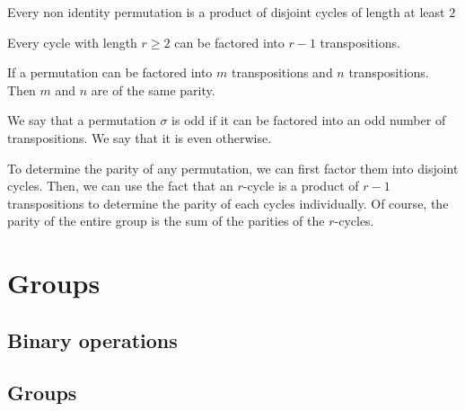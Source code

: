 \documentclass{article}
\begin{document}
\begin{theorem}
    Every non identity permutation is a product of disjoint cycles of length at least $2$
\end{theorem}
\begin{theorem}
    Every cycle with length $r\geq 2$ can be factored into $r-1$ transpositions.
\end{theorem}
\begin{theorem}
    If a permutation can be factored into $m$ transpositions and $n$ transpositions. Then $m$ and $n$ are of the same parity.
\end{theorem}
\begin{definition}
    We say that a permutation $\sigma$ is odd if it can be factored into an odd number of transpositions. We say
    that it is even otherwise.
\end{definition}
To determine the parity of any permutation, we can first factor them into disjoint cycles. Then, we can use the fact
that an $r$-cycle is a product of $r-1$ transpositions to determine the parity of each cycles individually. Of course,
the parity of the entire group is the sum of the parities of the $r$-cycles. 
\section{Groups}
\subsection{Binary operations}

\subsection{Groups}

\newpage
\end{document}
